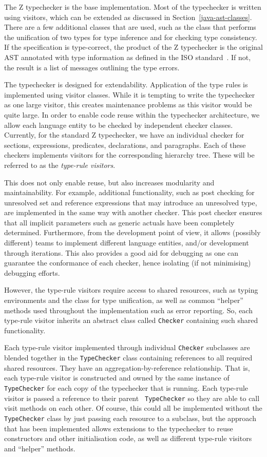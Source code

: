 \documentclass{llncs}
\begin{document}
The Z typechecker is the base implementation. Most of the typechecker
is written using visitors, which can be extended as discussed in
Section~\ref{java-ast-classes}. There are a few additional classes
that are used, such as the class that performs the unification of two
types for type inference and for checking type consistency. If the
specification is type-correct, the product of the Z typechecker is the
original AST annotated with type information as defined in the ISO
standard~\cite[Section~10]{isoz}.  If not, the result is a list of
messages outlining the type errors.

The typechecker is designed for extendability. Application of the type
rules is implemented using visitor classes. While it is tempting to
write the typechecker as one large visitor, this creates maintenance
problems as this visitor would be quite large.  In order to enable
code reuse within the typechecker architecture, we allow each language
entity to be checked by independent checker classes.  Currently, for
the standard Z typechecker, we have an individual checker for
sections, expressions, predicates, declarations, and paragraphs. Each
of these checkers implements visitors for the corresponding hierarchy
tree.  These will be referred to as the {\em type-rule visitors}.

This does not only enable reuse, but also increases modularity and
maintainability.  For example, additional functionality, such as post
checking for unresolved set and reference expressions that may
introduce an unresolved type, are implemented in the same way with
another checker. This post checker ensures that all implicit
parameters such as generic actuals have been completely determined.
Furthermore, from the development point of view, it allows (possibly
different) teams to implement different language entities, and/or
development through iterations.  This also provides a good aid for
debugging as one can guarantee the conformance of each checker, hence
isolating (if not minimising) debugging efforts.

However, the type-rule visitors require access to shared resources,
such as typing environments and the class for type unification, as
well as common ``helper'' methods used throughout the implementation
such as error reporting.  So, each type-rule visitor inherits an
abstract class called {\tt Checker} containing such shared
functionality.

Each type-rule visitor implemented through individual {\tt Checker}
subclasses are blended together in the {\tt TypeChecker} class
containing references to all required shared resources. They have an
aggregation-by-reference relationship.  That is, each type-rule
visitor is constructed and owned by the same instance of {\tt
TypeChecker} for each copy of the typechecker that is running.  Each
type-rule visitor is passed a reference to their parent {\tt
TypeChecker} so they are able to call visit methods on each other.  Of
course, this could all be implemented without the {\tt TypeChecker}
class by just passing each resource to a subclass, but the approach
that has been implemented allows extensions to the typechecker to
reuse constructors and other initialisation code, as well as different
type-rule visitors and ``helper'' methods.
\end{document}
